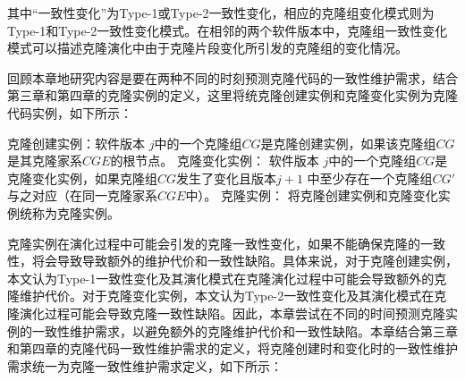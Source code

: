 
其中“一致性变化”为Type-1或Type-2一致性变化，相应的克隆组变化模式则为Type-1和Type-2一致性变化模式。在相邻的两个软件版本中，克隆组一致性变化模式可以描述克隆演化中由于克隆片段变化所引发的克隆组的变化情况。

回顾本章地研究内容是要在两种不同的时刻预测克隆代码的一致性维护需求，结合第三章和第四章的克隆实例的定义，这里将统克隆创建实例和克隆变化实例为克隆代码实例，如下所示：

\begin{definition} 
\label{def-instance}
克隆创建实例：软件版本 $j$中的一个克隆组$CG$是克隆创建实例，如果该克隆组$CG$是其克隆家系$CGE$的根节点。
克隆变化实例：
软件版本 $j$中的一个克隆组$CG$是克隆变化实例，如果克隆组$CG$发生了变化且版本$j+1$ 中至少存在一个克隆组$CG'$与之对应（在同一克隆家系$CGE$中）。 
克隆实例： 将克隆创建实例和克隆变化实例统称为克隆实例。
\end{definition}



克隆实例在演化过程中可能会引发的克隆一致性变化，如果不能确保克隆的一致性，将会导致导致额外的维护代价和一致性缺陷。具体来说，对于克隆创建实例，本文认为Type-1一致性变化及其演化模式在克隆演化过程中可能会导致额外的克隆维护代价。对于克隆变化实例，本文认为Type-2一致性变化及其演化模式在克隆演化过程可能会导致克隆一致性缺陷。因此，本章尝试在不同的时间预测克隆实例的一致性维护需求，以避免额外的克隆维护代价和一致性缺陷。本章结合第三章和第四章的克隆代码一致性维护需求的定义，将克隆创建时和变化时的一致性维护需求统一为克隆一致性维护需求定义，如下所示：

